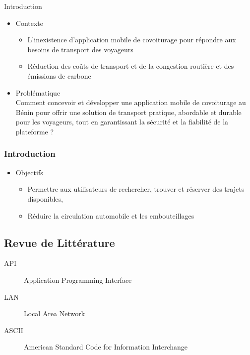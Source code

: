 \documentclass{beamer}
\begin{document}
\begin{frame}{Introduction} %
  \begin{itemize}
    \item Contexte
        \begin{itemize}
            \item L'inexistence d'application mobile de covoiturage pour répondre aux besoins de transport des voyageurs \vspace{.05cm}
            \item Réduction des coûts de transport et de la congestion routière et des émissions de carbone
        \end{itemize}
        
    \item Problématique \\
    \small{Comment concevoir et développer une application mobile de covoiturage au Bénin pour offrir une solution de transport pratique, abordable et durable pour les voyageurs, tout en garantissant la sécurité et la fiabilité de la plateforme ?}
\end{itemize}
\end{frame}


\begin{frame}
  \frametitle{Introduction}
      \begin{itemize}    
          \item Objectifs
              \begin{itemize}
                  \item Permettre aux utilisateurs de rechercher, trouver et réserver des trajets disponibles,
                  \item Réduire la circulation automobile et les embouteillages
              \end{itemize}
  \end{itemize}
\end{frame}

\begin{frame}
  \begin{center}
    \section{\huge{Revue de Littérature}}
  \end{center}
\end{frame}

\begin{frame}
  \begin{description}
    \item[API] Application Programming Interface
    \item[LAN] Local Area Network
    \item[ASCII] American Standard Code for Information Interchange
    \end{description}
\end{frame}
\end{document}
